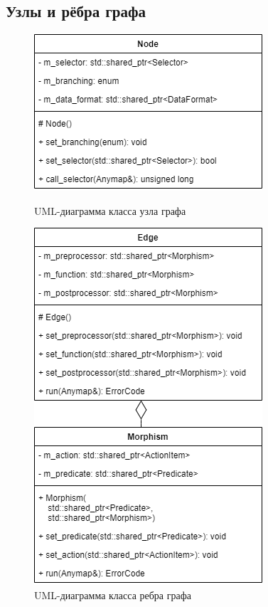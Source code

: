 ﻿%
\subsection{Узлы и рёбра графа}
\begin{frame}%
\begin{figure}
	\begin{minipage}{0.49\textwidth}
		\centering
		\includegraphics[width=\textwidth]{images/class.node.png}
		\caption{UML-диаграмма класса узла графа}
	\end{minipage}\hfill\begin{minipage}{0.49\textwidth}
		\centering
		\includegraphics[scale=0.34]{images/class.edge.png}
		\caption{UML-диаграмма класса ребра графа}
	\end{minipage}\hfill
\end{figure}
\end{frame}
